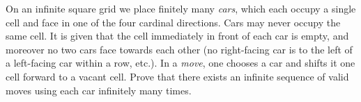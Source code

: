 On an infinite square grid we place finitely many \emph{cars}, which each occupy a single cell and face in one of the four cardinal directions. Cars may never occupy the same cell. It is given that the cell immediately in front of each car is empty, and moreover no two cars face towards each other (no right-facing car is to the left of a left-facing car within a row, etc.). In a \emph{move}, one chooses a car and shifts it one cell forward to a vacant cell. Prove that there exists an infinite sequence of valid moves using each car infinitely many times.